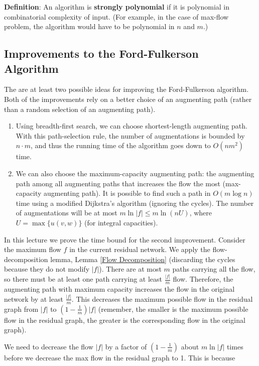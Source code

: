 \documentclass{article}
\begin{document}
\textbf{Definition}:
An algorithm is \textbf{strongly polynomial} if it is polynomial in
combinatorial complexity of input. (For example, in the case of
max-flow problem, the algorithm would have to be polynomial in $n$
and $m$.)


\subsection{Improvements to the Ford-Fulkerson Algorithm}

The are at least two possible ideas for improving the Ford-Fulkerson
algorithm. Both of the improvements rely on a better choice of an
augmenting path (rather than a random selection of an augmenting path).

\begin{enumerate}
  \item
    Using breadth-first search, we can choose shortest-length
    augmenting path. With this path-selection rule, the number of
    augmentations is bounded by $n\cdot m$, and thus the running time
    of the algorithm goes down to $O(nm^2)$ time.
  \item
    We can also choose the maximum-capacity augmenting path: the
    augmenting path among all augmenting paths that increases the flow
    the most (max-capacity  augmenting path). It is possible to find
    such a path in $O(m\log n)$ time using a modified Dijkstra's
    algorithm (ignoring the cycles). The number of augmentations will
    be at most $m\ln|f|\le  m\ln(nU)$, where $U=\max\{u(v,w)\}$ (for
    integral capacities). 
\end{enumerate}

In this lecture we prove the time bound for the second
improvement.  
Consider the maximum flow $f$ in the current residual network. We
apply the flow-decomposition lemma, Lemma \ref{Flow Decomposition}
(discarding the cycles because they do not modify $|f|$). There are at most
$m$ paths carrying all the flow, so there must be at
least one path carrying at least $\frac{|f|}{m}$ flow. Therefore, the augmenting
path with maximum capacity increases the flow in the original network
by at least $\frac{|f|}{m}$.   This  decreases the maximum possible flow in
the residual graph  from $|f|$ to $(1-\frac{1}{m})|f|$ (remember, the
smaller is the maximum possible flow in the residual graph, the
greater is the corresponding flow in the original graph). 


We need to decrease the flow $|f|$ by a factor of $(1-\frac{1}{m})$ about
$m\ln|f|$ times before we decrease the max flow in the residual graph
to 1.  This is because
\end{document}
